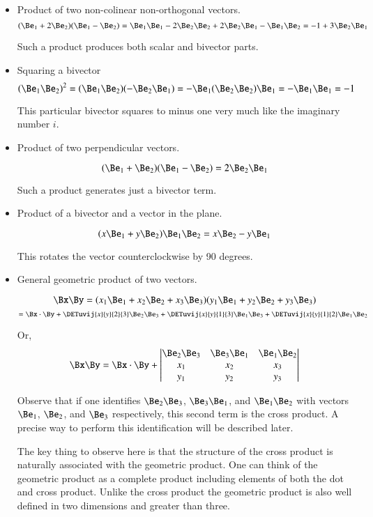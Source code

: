 \documentclass{article}      %
\begin{document}
\begin{itemize}
\item Product of two non-colinear non-orthogonal vectors.
\[
(\Be_1 + 2\Be_2) (\Be_1 - \Be_2)
= \Be_1\Be_1 -2\Be_2\Be_2 + 2\Be_2\Be_1 - \Be_1\Be_2
= -1 + 3\Be_2\Be_1 
\]

Such a product produces both scalar and bivector parts.

\item Squaring a bivector
\[
(\Be_1\Be_2)^2
=
(\Be_1\Be_2)(-\Be_2\Be_1)
=
-\Be_1(\Be_2\Be_2)\Be_1
=
-\Be_1\Be_1
=
-1
\]

This particular bivector squares to minus one very much like the imaginary number $i$.

\item Product of two perpendicular vectors.

\[
(\Be_1 + \Be_2) (\Be_1 - \Be_2) = 2\Be_2\Be_1
\]

Such a product generates just a bivector term.

\item Product of a bivector and a vector in the plane.

\[
(x\Be_1 + y\Be_2) \Be_1\Be_2
=
x\Be_2 - y\Be_1
\]

This rotates the vector counterclockwise by 90 degrees.

\item General  geometric product of two vectors.

\[
\Bx \By =
(x_1\Be_1
+x_2\Be_2
+x_3\Be_3)
(y_1\Be_1
+y_2\Be_2
+y_3\Be_3)
\]
\[
=
\Bx \cdot \By 
+\DETuvij{x}{y}{2}{3} \Be_2 \Be_3
+\DETuvij{x}{y}{1}{3} \Be_1 \Be_3
+\DETuvij{x}{y}{1}{2} \Be_1 \Be_2
\]

Or,
\[
\Bx \By =
\Bx \cdot \By +
\begin{vmatrix}
\Be_2\Be_3 & \Be_3\Be_1 & \Be_1\Be_2 \\
x_1 & x_2 & x_3 \\
y_1 & y_2 & y_3 \\
\end{vmatrix}
\]

Observe that if one identifies 
$\Be_2\Be_3$, $\Be_3\Be_1$, and $\Be_1\Be_2$ with vectors 
$\Be_1$,
$\Be_2$,
and $\Be_3$ respectively, this second term is the cross product.  A precise way to perform this identification will be described later.

The key thing to observe here is
that the structure of the cross product is naturally associated with the geometric product.  One can think of the geometric product
as a complete product including elements of both the dot and cross product.  Unlike the cross product the geometric product is also well defined
in two dimensions and greater than three.

\end{itemize}
\end{document}
